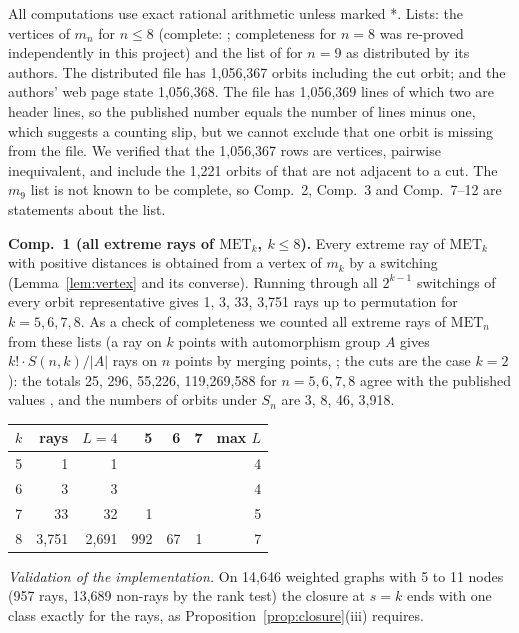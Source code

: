 \documentclass[11pt,a4paper]{article}
\theoremstyle{definition}
\theoremstyle{remark}
\newcommand{\MET}{\mathrm{MET}}
\newcommand{\comp}[1]{\medskip\noindent\textbf{#1}}
\begin{document}
All computations use exact rational arithmetic unless marked *. Lists: the vertices of $m_n$ for $n \le 8$
(complete: \cite{DFPS01,DFMV03}; completeness for $n = 8$ was re-proved independently in this project) and the list
of \cite{DI07} for $n = 9$ as distributed by its authors. The distributed file has 1,056,367 orbits including the
cut orbit; \cite{DI07} and the authors' web page state 1,056,368. The file has 1,056,369 lines of which two are
header lines, so the published number equals the number of lines minus one, which suggests a counting slip, but we
cannot exclude that one orbit is missing from the file. We verified that the 1,056,367 rows are vertices, pairwise
inequivalent, and include the 1,221 orbits of \cite{DI07} that are not adjacent to a cut. The $m_9$ list is not
known to be complete, so Comp.~2, Comp.~3 and Comp.~7--12 are statements about the list.

\comp{Comp.~1 (all extreme rays of $\MET_k$, $k \le 8$).} Every extreme ray of $\MET_k$ with positive distances is
obtained from a vertex of $m_k$ by a switching (Lemma~\ref{lem:vertex} and its converse). Running through all
$2^{k-1}$ switchings of every orbit representative gives 1, 3, 33, 3,751 rays up to permutation for
$k = 5, 6, 7, 8$. As a check of completeness we counted all extreme rays of $\MET_n$ from these lists (a ray on $k$
points with automorphism group $A$ gives $k!\cdot S(n,k)/|A|$ rays on $n$ points by merging points,
\cite[Thm 4.2]{A80}; the cuts are the case $k = 2$): the totals 25, 296, 55,226, 119,269,588 for $n = 5, 6, 7, 8$
agree with the published values \cite{DDweb}, and the numbers of orbits under $S_n$ are 3, 8, 46, 3,918.
\begin{center}
\begin{tabular}{rrrrrrr}
\toprule
$k$ & rays & $L = 4$ & 5 & 6 & 7 & max $L$ \\
\midrule
5 & 1 & 1 & & & & 4 \\
6 & 3 & 3 & & & & 4 \\
7 & 33 & 32 & 1 & & & 5 \\
8 & 3,751 & 2,691 & 992 & 67 & 1 & 7 \\
\bottomrule
\end{tabular}
\end{center}
\emph{Validation of the implementation.} On 14,646 weighted graphs with 5 to 11 nodes (957 rays, 13,689 non-rays by
the rank test) the closure at $s = k$ ends with one class exactly for the rays, as
Proposition~\ref{prop:closure}(iii) requires.
\end{document}
